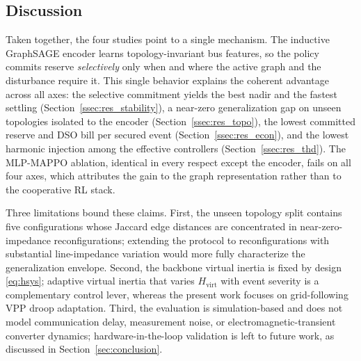 \documentclass[lettersize,journal]{IEEEtran}
\begin{document}
\subsection{Discussion}
\label{ssec:discussion}
 
Taken together, the four studies point to a single mechanism. The inductive GraphSAGE encoder learns topology-invariant bus features, so the policy commits reserve \emph{selectively} only when and where the active graph and the disturbance require it. This single behavior explains the coherent advantage across all axes: the selective commitment yields the best nadir and the fastest settling (Section~\ref{ssec:res_stability}), a near-zero generalization gap on unseen topologies isolated to the encoder (Section~\ref{ssec:res_topo}), the lowest committed reserve and DSO bill per secured event (Section~\ref{ssec:res_econ}), and the lowest harmonic injection among the effective controllers (Section~\ref{ssec:res_thd}). The MLP-MAPPO ablation, identical in every respect except the encoder, fails on all four axes, which attributes the gain to the graph representation rather than to the cooperative RL stack.
 
Three limitations bound these claims. First, the unseen topology split contains five configurations whose Jaccard edge distances are concentrated in near-zero-impedance reconfigurations; extending the protocol to reconfigurations with substantial line-impedance variation would more fully characterize the generalization envelope. Second, the backbone virtual inertia is fixed by design \eqref{eq:hsys}; adaptive virtual inertia that varies $H_{\mathrm{virt}}$ with event severity is a complementary control lever, whereas the present work focuses on grid-following VPP droop adaptation. Third, the evaluation is
simulation-based and does not model communication delay, measurement noise, or electromagnetic-transient converter dynamics; hardware-in-the-loop validation is left to future work, as discussed in Section~\ref{sec:conclusion}.
\end{document}
